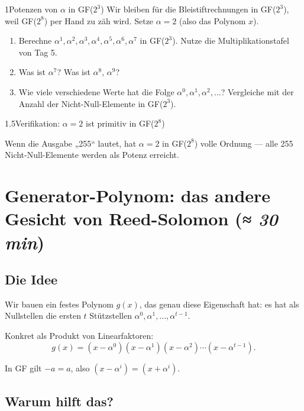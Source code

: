 \begin{bleistiftuebung}{1}{Potenzen von $\alpha$ in GF($2^3$)}
Wir bleiben für die Bleistiftrechnungen in GF($2^3$), weil GF($2^8$)
per Hand zu zäh wird. Setze $\alpha = 2$ (also das Polynom $x$).

\begin{enumerate}[label=(\alph*), leftmargin=*]
\item Berechne $\alpha^1, \alpha^2, \alpha^3, \alpha^4, \alpha^5,
  \alpha^6, \alpha^7$ in GF($2^3$). Nutze die Multiplikationstafel
  von Tag 5.
\item Was ist $\alpha^7$? Was ist $\alpha^8$, $\alpha^9$?
\item Wie viele verschiedene Werte hat die Folge $\alpha^0, \alpha^1,
  \alpha^2, \dots$? Vergleiche mit der Anzahl der Nicht-Null-Elemente
  in GF($2^3$).
\end{enumerate}
\end{bleistiftuebung}

\begin{pythoneinheit}{1.5}{Verifikation: $\alpha = 2$ ist primitiv in GF($2^8$)}

Wenn die Ausgabe „255“ lautet, hat $\alpha = 2$ in GF($2^8$) volle
Ordnung — alle 255 Nicht-Null-Elemente werden als Potenz erreicht.
\end{pythoneinheit}

\section{Generator-Polynom: das andere Gesicht von Reed-Solomon \normalfont(\textit{≈ 30 min})}

\subsection*{Die Idee}

Wir bauen ein festes Polynom $g(x)$, das genau diese Eigenschaft hat:
es hat als Nullstellen die ersten $t$ Stützstellen $\alpha^0, \alpha^1,
\dots, \alpha^{t-1}$.

Konkret als Produkt von Linearfaktoren:
\[
  g(x) = (x - \alpha^0)(x - \alpha^1)(x - \alpha^2) \cdots
         (x - \alpha^{t-1}).
\]

In GF gilt $-a = a$, also $(x - \alpha^i) = (x + \alpha^i)$.

\subsection*{Warum hilft das?}

